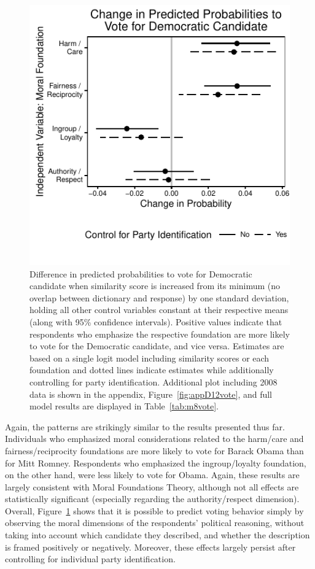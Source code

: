 \documentclass[12pt]{article}
\begin{document}
\begin{figure}[h]\centering
\includegraphics[scale=.9]{../calc/fig/logit_vote.pdf}
\caption{Difference in predicted probabilities to vote for Democratic candidate when similarity score is increased from its minimum (no overlap between dictionary and response) by one standard deviation, holding all other control variables constant at their respective means (along with 95\% confidence intervals). Positive values indicate that respondents who emphasize the respective foundation are more likely to vote for the Democratic candidate, and vice versa. Estimates are based on a single logit model including similarity scores or each foundation and dotted lines indicate estimates while additionally controlling for party identification. Additional plot including 2008 data is shown in the appendix, Figure~\ref{fig:appD12vote}, and full model results are displayed in Table~\ref{tab:m8vote}.}\label{fig:logit_vote}
\end{figure}

Again, the patterns are strikingly similar to the results presented thus far. Individuals who emphasized moral considerations related to the harm/care and fairness/reciprocity foundations are more likely to vote for Barack Obama than for Mitt Romney. Respondents who emphasized the ingroup/loyalty foundation, on the other hand, were less likely to vote for Obama. Again, these results are largely consistent with Moral Foundations Theory, although not all effects are statistically significant (especially regarding the authority/respect dimension). Overall, Figure~\ref{fig:logit_vote} shows that it is possible to predict voting behavior simply by observing the moral dimensions of the respondents' political reasoning, without taking into account which candidate they described, and whether the description is framed positively or negatively. Moreover, these effects largely persist after controlling for individual party identification.
\end{document}
